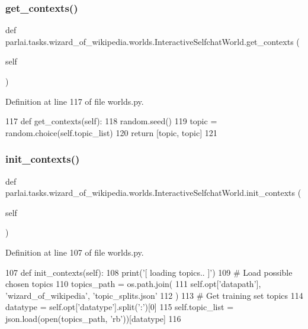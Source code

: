 \subsubsection{\texorpdfstring{get\+\_\+contexts()}{get\_contexts()}}
{\footnotesize\ttfamily def parlai.\+tasks.\+wizard\+\_\+of\+\_\+wikipedia.\+worlds.\+Interactive\+Selfchat\+World.\+get\+\_\+contexts (\begin{DoxyParamCaption}\item[{}]{self }\end{DoxyParamCaption})}



Definition at line 117 of file worlds.\+py.


\begin{DoxyCode}
117     \textcolor{keyword}{def }get\_contexts(self):
118         random.seed()
119         topic = random.choice(self.topic\_list)
120         \textcolor{keywordflow}{return} [topic, topic]
121 \end{DoxyCode}
\mbox{\label{classparlai_1_1tasks_1_1wizard__of__wikipedia_1_1worlds_1_1InteractiveSelfchatWorld_a7c8bb5adb1d2d5a94852dd205457dc6b}} 
\subsubsection{\texorpdfstring{init\+\_\+contexts()}{init\_contexts()}}
{\footnotesize\ttfamily def parlai.\+tasks.\+wizard\+\_\+of\+\_\+wikipedia.\+worlds.\+Interactive\+Selfchat\+World.\+init\+\_\+contexts (\begin{DoxyParamCaption}\item[{}]{self }\end{DoxyParamCaption})}



Definition at line 107 of file worlds.\+py.


\begin{DoxyCode}
107     \textcolor{keyword}{def }init\_contexts(self):
108         print(\textcolor{stringliteral}{'[ loading topics.. ]'})
109         \textcolor{comment}{# Load possible chosen topics}
110         topics\_path = os.path.join(
111             self.opt[\textcolor{stringliteral}{'datapath'}], \textcolor{stringliteral}{'wizard\_of\_wikipedia'}, \textcolor{stringliteral}{'topic\_splits.json'}
112         )
113         \textcolor{comment}{# Get training set topics}
114         datatype = self.opt[\textcolor{stringliteral}{'datatype'}].split(\textcolor{stringliteral}{':'})[0]
115         self.topic\_list = json.load(open(topics\_path, \textcolor{stringliteral}{'rb'}))[datatype]
116 
\end{DoxyCode}


